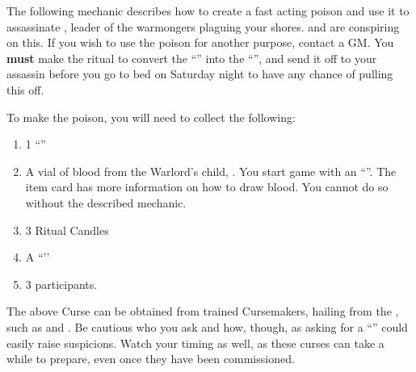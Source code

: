 \documentclass[green]{GL2020}
\begin{document}
\name{\gAssassinateWarlord{}}

The following mechanic describes how to create a fast acting poison and use it to assassinate \cLoud{\full}, leader of the \pShip{} warmongers plaguing your shores. \cEvil{\full} and \cDiplomat{\full} are conspiring on this. If you wish to use the poison for another purpose, contact a GM. You \textbf{must} make the ritual to convert the ``\iSlowActingPoison{}'' into the ``\iFastActingPoison{}'', and send it off to your assassin before you go to bed on Saturday night to have any chance of pulling this off.

To make the poison, you will need to collect the following:
\begin{enumerate}
  \item 1 ``\iSlowActingPoison{}''
  \item A vial of blood from the Warlord’s child, \cWarlordDaughter{\full}. You start game with an ``\iGlassVial{}''. The item card has more information on how to draw blood. You cannot do so without the described mechanic.
  \item 3 Ritual Candles
  \item A ``\iStoneFlower{}’’
  \item 3 participants.
\end{enumerate}

The above Curse can be obtained from trained Cursemakers, hailing from the \pFarm{}, such as \cPrince{\full} and \cCurse{\full}. Be cautious who you ask and how, though, as asking for a ``\iSlowActingPoison{}'' could easily raise suspicions. Watch your timing as well, as these curses can take a while to prepare, even once they have been commissioned.
\end{document}
